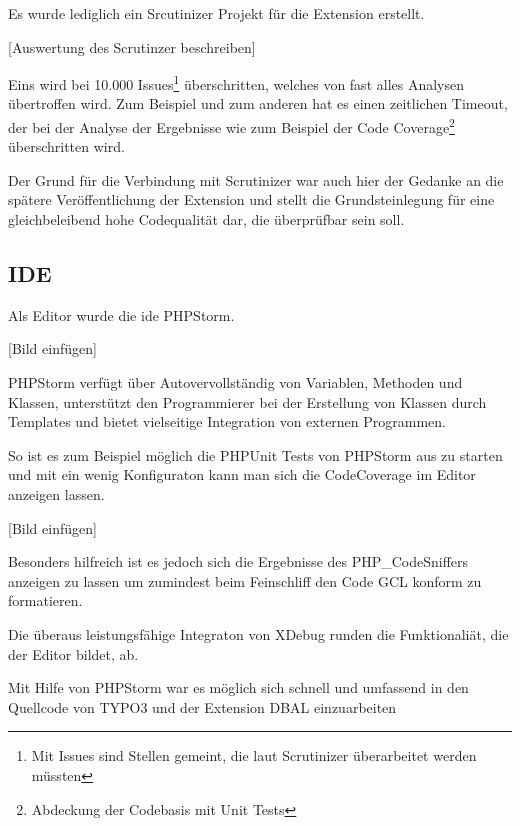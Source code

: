 Es wurde lediglich ein Srcutinizer Projekt für die Extension erstellt.

[Auswertung des Scrutinzer beschreiben]

Eins wird bei 10.000 Issues\footnote{Mit Issues sind Stellen gemeint, die laut Scrutinizer überarbeitet werden müssten} überschritten, welches von fast alles Analysen übertroffen wird. Zum Beispiel und zum anderen hat es einen zeitlichen Timeout, der bei der Analyse der Ergebnisse wie zum Beispiel der Code Coverage\footnote{Abdeckung der Codebasis mit Unit Tests} überschritten wird.

Der Grund für die Verbindung mit Scrutinizer war auch hier der Gedanke an die spätere Veröffentlichung der Extension und stellt die Grundsteinlegung für eine gleichbeleibend hohe Codequalität dar, die überprüfbar sein soll.

\subsection{IDE}
Als Editor wurde die \gls{ide} PHPStorm. 

[Bild einfügen]

PHPStorm verfügt über Autovervollständig von Variablen, Methoden und Klassen, unterstützt den Programmierer bei der Erstellung von Klassen durch Templates und bietet vielseitige Integration von externen Programmen. 

So ist es zum Beispiel möglich die PHPUnit Tests von PHPStorm aus zu starten und mit ein wenig Konfiguraton\cite{web:kowalke14} kann man sich die CodeCoverage im Editor anzeigen lassen.

[Bild einfügen]

Besonders hilfreich ist es jedoch sich die Ergebnisse des PHP\_CodeSniffers anzeigen zu lassen um zumindest beim Feinschliff den Code GCL konform zu formatieren.

Die überaus leistungsfähige Integraton von XDebug runden die Funktionaliät, die der Editor bildet, ab.

Mit Hilfe von PHPStorm war es möglich sich schnell und umfassend in den Quellcode von TYPO3 und der Extension DBAL einzuarbeiten
